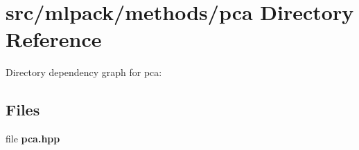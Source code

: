 \section{src/mlpack/methods/pca Directory Reference}
\label{dir_64495ea1616ed1397bf6a8c04e951137}
Directory dependency graph for pca\-:
\subsection*{Files}
\begin{DoxyCompactItemize}
\item 
file {\bf pca.\-hpp}
\end{DoxyCompactItemize}
